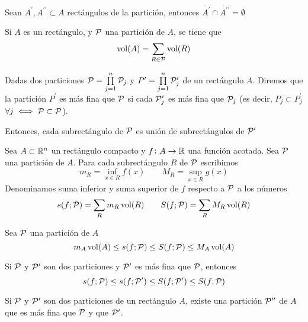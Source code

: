 \begin{obs*}
    Sean $A^\prime,A^{\prime\prime}\subset A$ rectángulos de la partición, entonces
    $\mathring{A^\prime} \cap \mathring{A^{\prime\prime}} = \emptyset$
\end{obs*}

\begin{lema}
    Si $A$ es un rectángulo, y $\mathcal{P}$ una partición de $A$, se tiene que
    \[
        \operatorname{vol}(A) = \sum_{R \in \mathcal{P}} \operatorname{vol}(R)
    \]
\end{lema}

\begin{defi}
    Dadas dos particiones $\mathcal{P} = \prod\limits^n_{j=1} \mathcal{P}_j$ y
    $P^\prime = \prod\limits^n_{j=1} \mathcal{P}^\prime_j$ de un rectángulo $A$. Diremos
    que la partición $P^\prime$ es más fina que $\mathcal{P}$ si cada $\mathcal{P}^\prime_j$ es más
    fina que $\mathcal{P}_j$ (es decir, $P_j \subset P^\prime_j$ $\forall j \iff \mathcal{P}
    \subset \mathcal{P}$).

    Entonces, cada subrectángulo de $\mathcal{P}$ es unión de subrectángulos de
    $\mathcal{P}^\prime$
\end{defi}

\begin{defi}
    Sea $A \subset \mathbb{R}^n$ un rectángulo compacto y $f \colon A \to \mathbb{R}$ una
    función acotada. Sea $\mathcal{P}$ una partición de $A$. Para cada subrectángulo $R$
    de $\mathcal{P}$ escribimos
    \[
        m_R = \inf_{x \in R} f(x) \qquad M_R = \sup_{x \in R} g(x)
    \]
    Denominamos suma inferior y suma superior de $f$ respecto a $\mathcal{P}$ a los números
    \[
        s(f;\mathcal{P}) = \sum_R m_R\operatorname{vol}(R) \qquad S(f;\mathcal{P}) = \sum_R M_R\operatorname{vol}(R)
    \]
\end{defi}

\begin{obs}
    Sea $\mathcal{P}$ una partición de $A$
    \[
        m_A\operatorname{vol}(A) \leq s(f;\mathcal{P}) \leq S(f;\mathcal{P}) \leq M_A\operatorname{vol}(A)
    \]
\end{obs}
\begin{obs}
    Si $\mathcal{P}$ y $\mathcal{P}^\prime$ son dos particiones y $\mathcal{P}^\prime$ es más fina que
    $\mathcal{P}$, entonces
    \[
        s(f;\mathcal{P}) \leq s(f;\mathcal{P}^\prime) \leq S(f;\mathcal{P}^\prime) \leq S(f;\mathcal{P})
    \]
\end{obs}

\begin{lema}
    Si $\mathcal{P}$ y $\mathcal{P}^\prime$ son dos particiones de un rectángulo $A$, existe una
    partición $\mathcal{P}^{\prime\prime}$ de $A$ que es más fina que $\mathcal{P}$ y que
    $\mathcal{P}^\prime$.
\end{lema}

